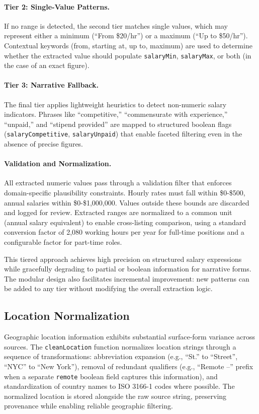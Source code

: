 \paragraph{Tier 2: Single-Value Patterns.} If no range is detected, the second tier matches single values, which may represent either a minimum (``From \$20/hr'') or a maximum (``Up to \$50/hr''). Contextual keywords (from, starting at, up to, maximum) are used to determine whether the extracted value should populate \texttt{salaryMin}, \texttt{salaryMax}, or both (in the case of an exact figure).

\paragraph{Tier 3: Narrative Fallback.} The final tier applies lightweight heuristics to detect non-numeric salary indicators. Phrases like ``competitive,'' ``commensurate with experience,'' ``unpaid,'' and ``stipend provided'' are mapped to structured boolean flags (\texttt{salaryCompetitive}, \texttt{salaryUnpaid}) that enable faceted filtering even in the absence of precise figures.

\paragraph{Validation and Normalization.} All extracted numeric values pass through a validation filter that enforces domain-specific plausibility constraints. Hourly rates must fall within \$0-\$500, annual salaries within \$0-\$1,000,000. Values outside these bounds are discarded and logged for review. Extracted ranges are normalized to a common unit (annual salary equivalent) to enable cross-listing comparison, using a standard conversion factor of 2,080 working hours per year for full-time positions and a configurable factor for part-time roles.

This tiered approach achieves high precision on structured salary expressions while gracefully degrading to partial or boolean information for narrative forms. The modular design also facilitates incremental improvement: new patterns can be added to any tier without modifying the overall extraction logic.

\subsection{Location Normalization}

Geographic location information exhibits substantial surface-form variance across sources. The \texttt{cleanLocation} function normalizes location strings through a sequence of transformations: abbreviation expansion (e.g., ``St.'' to ``Street'', ``NYC'' to ``New York''), removal of redundant qualifiers (e.g., ``Remote --'' prefix when a separate \texttt{remote} boolean field captures this information), and standardization of country names to ISO 3166-1 codes where possible. The normalized location is stored alongside the raw source string, preserving provenance while enabling reliable geographic filtering.

